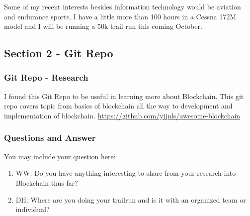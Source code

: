 Some of my recent interests besides information technology would be aviation and endurance sports. I have a little more than 100 hours in a Cessna 172M model and I will be running a 50k trail run this coming October.

\subsection{Section 2 - Git Repo}

\subsubsection{Git Repo - Research}
I found this Git Repo to be useful in learning more about Blockchain. This git repo covers topic from basics of blockchain all the way to development and implementation of blockchain.
\url{https://github.com/yjjnls/awesome-blockchain}


\subsubsection{Questions and Answer} 
You may include your question here:

\begin{enumerate}
    \item WW: Do you have anything interesting to share from your research into Blockchain thus far?
    \item DH: Where are you doing your trailrun and is it with an organized team or individual?
\end{enumerate}
